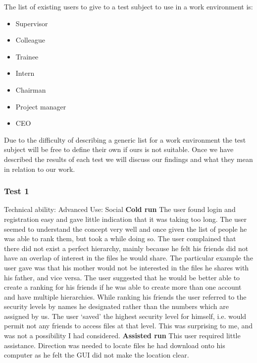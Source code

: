 \documentclass[12pt, titlepage]{article}
\begin{document}
The list of existing users to give to a test subject to use in a work environment is:
\begin{itemize}
	\item Supervisor
	\item Colleague
	\item Trainee
	\item Intern
	\item Chairman
	\item Project manager
	\item CEO
\end{itemize}
Due to the difficulty of describing a generic list for a work environment the test subject will be free to define their own if ours is not suitable.
\newline Once we have described the results of each test we will discuss our findings and what they mean in relation to our work.

\subsubsection{Test 1}
Technical ability: Advanced
\newline Use: Social
\newline
\newline \textbf{Cold run}
\newline The user found login and registration easy and gave little indication that it was taking too long. The user seemed to understand the concept very well and once given the list of people he was able to rank them, but took a while doing so. The user complained that there did not exist a perfect hierarchy, mainly because he felt his friends did not have an overlap of interest in the files he would share. The particular example the user gave was that his mother would not be interested in the files he shares with his father, and vice versa. The user suggested that he would be better able to create a ranking for his friends if he was able to create more than one account and have multiple hierarchies. While ranking his friends the user referred to the security levels by names he designated rather than the numbers which are assigned by us. The user `saved' the highest security level for himself, i.e. would permit not any friends to access files at that level. This was surprising to me, and was not a possibility I had considered.
\newline
\newline \textbf{Assisted run}
This user required little assistance. Direction was needed to locate files he had download onto his computer as he felt the GUI did not make the location clear.
\end{document}
